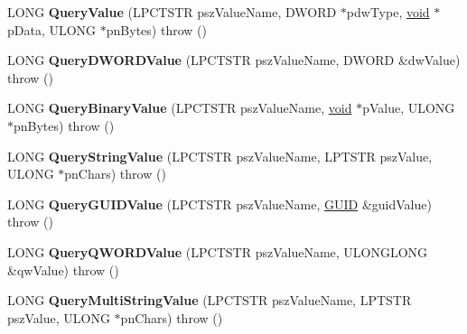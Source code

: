 \begin{DoxyCompactItemize}
\item 
\mbox{\label{class_a_t_l_1_1_c_reg_key_ac2bf11426883f7a87809030329423cc2}} 
L\+O\+NG {\bfseries Query\+Value} (L\+P\+C\+T\+S\+TR psz\+Value\+Name, D\+W\+O\+RD $\ast$pdw\+Type, \hyperlink{interfacevoid}{void} $\ast$p\+Data, U\+L\+O\+NG $\ast$pn\+Bytes)  throw ()
\item 
\mbox{\label{class_a_t_l_1_1_c_reg_key_a6c78c3d18716c810f0b166d5cc86e16c}} 
L\+O\+NG {\bfseries Query\+D\+W\+O\+R\+D\+Value} (L\+P\+C\+T\+S\+TR psz\+Value\+Name, D\+W\+O\+RD \&dw\+Value)  throw ()
\item 
\mbox{\label{class_a_t_l_1_1_c_reg_key_a812b8db99e34b0a60d604b230972e719}} 
L\+O\+NG {\bfseries Query\+Binary\+Value} (L\+P\+C\+T\+S\+TR psz\+Value\+Name, \hyperlink{interfacevoid}{void} $\ast$p\+Value, U\+L\+O\+NG $\ast$pn\+Bytes)  throw ()
\item 
\mbox{\label{class_a_t_l_1_1_c_reg_key_a13e91d14ae3759999d783feedd6daa9f}} 
L\+O\+NG {\bfseries Query\+String\+Value} (L\+P\+C\+T\+S\+TR psz\+Value\+Name, L\+P\+T\+S\+TR psz\+Value, U\+L\+O\+NG $\ast$pn\+Chars)  throw ()
\item 
\mbox{\label{class_a_t_l_1_1_c_reg_key_aea242807171acbade5ce8aec532e793c}} 
L\+O\+NG {\bfseries Query\+G\+U\+I\+D\+Value} (L\+P\+C\+T\+S\+TR psz\+Value\+Name, \hyperlink{interface_g_u_i_d}{G\+U\+ID} \&guid\+Value)  throw ()
\item 
\mbox{\label{class_a_t_l_1_1_c_reg_key_af42b5e914947959bde2f922f020c7c6b}} 
L\+O\+NG {\bfseries Query\+Q\+W\+O\+R\+D\+Value} (L\+P\+C\+T\+S\+TR psz\+Value\+Name, U\+L\+O\+N\+G\+L\+O\+NG \&qw\+Value)  throw ()
\item 
\mbox{\label{class_a_t_l_1_1_c_reg_key_aec515b6081fd0e302655236a47a3187f}} 
L\+O\+NG {\bfseries Query\+Multi\+String\+Value} (L\+P\+C\+T\+S\+TR psz\+Value\+Name, L\+P\+T\+S\+TR psz\+Value, U\+L\+O\+NG $\ast$pn\+Chars)  throw ()
\item 
\mbox{\label{class_a_t_l_1_1_c_reg_key_ad10a9fb5e2809cc079ea05868721309a}} 

\end{DoxyCompactItemize}
